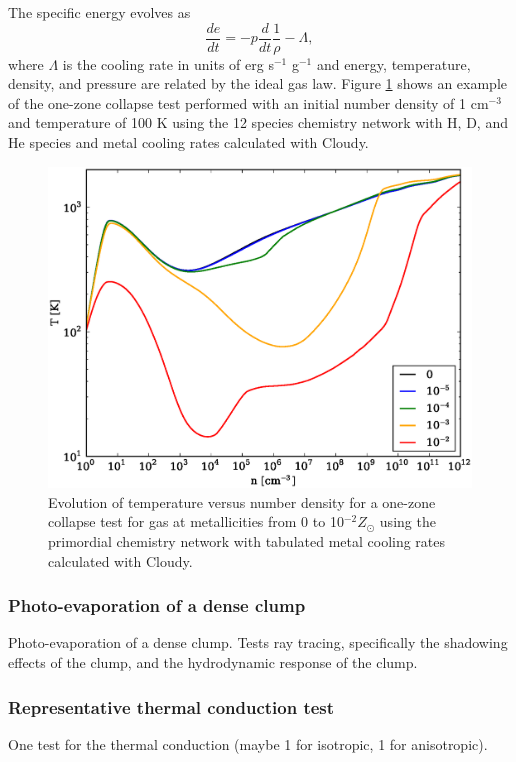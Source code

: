 The specific energy evolves as
\begin{equation}
\frac{de}{dt} = -p \frac{d}{dt} \frac{1}{\rho} - \Lambda,
\end{equation}
where $\Lambda$ is the cooling rate in units of erg s$^{-1}$ g$^{-1}$
and energy, temperature, density, and pressure are related by the
ideal gas law.  Figure \ref{fig.onezone} shows an example of the
one-zone collapse test performed with an initial number density of 1
cm$^{-3}$ and temperature of 100 K using the 12 species chemistry
network with H, D, and He species and metal cooling rates calculated
with Cloudy.

\begin{figure}
  \begin{center}
    \includegraphics[width=1.0\textwidth]{figures/OneZoneCollapseTest.eps}
  \end{center}
  \caption{Evolution of temperature versus number density for a one-zone
    collapse test for gas at metallicities from 0 to 10$^{-2} Z_{\odot}$
    using the primordial chemistry network with tabulated metal cooling
    rates calculated with Cloudy.}
  \label{fig.onezone}
\end{figure}


\subsubsection{Photo-evaporation of a dense clump}
\label{sec.tests.raytracing}
Photo-evaporation of a dense clump.  Tests ray tracing, specifically
the shadowing effects of the clump, and the hydrodynamic response of
the clump.





\subsubsection{Representative thermal conduction test}
\label{sec.tests.conduct}
One test for the thermal conduction (maybe 1 for isotropic, 1 for
anisotropic).
